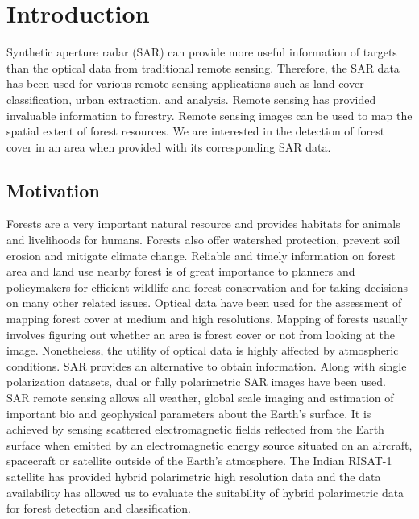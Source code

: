 
\chapter{Introduction} %

\label{Chapter 1} %


Synthetic aperture radar (SAR) can provide more useful information of targets than the optical data from traditional remote sensing. Therefore, the SAR data has been used for various remote sensing applications such as land cover classification, urban extraction, and analysis. Remote sensing has provided invaluable information to forestry. Remote sensing images can be used to map the spatial extent of forest resources. We are interested in the detection of forest cover in an area when provided with its corresponding SAR data.


\section{Motivation}

Forests are a very important natural resource and provides habitats for animals and livelihoods for humans. Forests also offer watershed protection, prevent soil erosion and mitigate climate change. Reliable and timely information on forest area and land use nearby forest is of great importance to planners and policymakers for efficient wildlife and forest conservation and for taking decisions on many other related issues. Optical data have been used for the assessment of mapping forest cover at medium and high resolutions. Mapping of forests usually involves figuring out whether an area is forest cover or not from looking at the image. Nonetheless, the utility of optical data is highly affected by atmospheric conditions. SAR provides an alternative to obtain information. Along with single polarization datasets, dual or fully polarimetric SAR images have been used. SAR remote sensing allows all weather, global scale imaging and estimation of important bio and geophysical parameters about the Earth's surface. It is achieved by sensing scattered electromagnetic fields reflected from the Earth surface when emitted by an electromagnetic energy source situated on an aircraft, spacecraft or satellite outside of the Earth's atmosphere\cite{pottier2009overview}.  The Indian RISAT-1 satellite has provided hybrid polarimetric high resolution data and the data availability has allowed us to evaluate the suitability of hybrid polarimetric data for forest detection and classification\cite{kothapalli2017multi}. 

